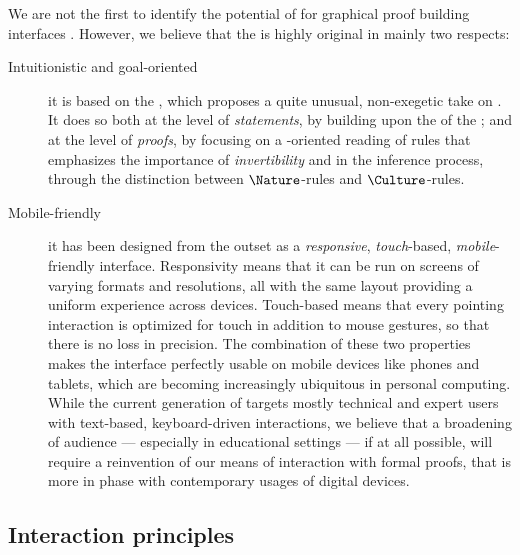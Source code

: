 \begin{scope}
We are not the first to identify the potential of  for graphical proof
building interfaces . However, we believe that
the  is highly original in mainly two respects:
\begin{description}
  \item[Intuitionistic and goal-oriented] it is based on the , which proposes a quite unusual, non-exegetic take on . It
  does so both at the level of \emph{statements}, by building upon the
    of the ; and
  at the level of \emph{proofs}, by focusing on a -oriented reading of
  rules that emphasizes the importance of \emph{invertibility} and
  \emph{} in the inference process, through the distinction
  between $\Nature$-rules and $\Culture$-rules.
  \item[Mobile-friendly] it has been designed from the outset as a
  \emph{responsive}, \emph{touch}-based, \emph{mobile}-friendly interface.
  Responsivity means that it can be run on screens of varying formats and
  resolutions, all with the same layout providing a uniform experience across
  devices. Touch-based means that every pointing interaction is optimized for
  touch in addition to mouse gestures, so that there is no loss in precision.
  The combination of these two properties makes the interface perfectly usable
  on mobile devices like phones and tablets, which are becoming increasingly
  ubiquitous in personal computing. While the current generation of  targets mostly technical and expert users with text-based,
  keyboard-driven interactions, we believe that a broadening of audience ---
  especially in educational settings --- if at all possible, will require a
  reinvention of our means of interaction with formal proofs, that is more in
  phase with contemporary usages of digital devices.
\end{description}

\subsection{Interaction principles}


\end{scope}
